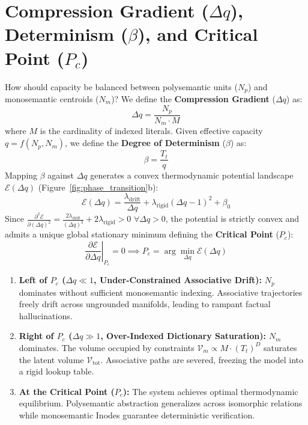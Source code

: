 \documentclass[10pt,twocolumn]{article}
\theoremstyle{definition}
\begin{document}
\section{Compression Gradient \texorpdfstring{($\Delta q$)}{(Delta q)}, Determinism \texorpdfstring{($\beta$)}{(beta)}, and Critical Point \texorpdfstring{($P_c$)}{(Pc)}}
How should capacity be balanced between polysemantic units ($N_p$) and monosemantic centroids ($N_m$)? We define the \textbf{Compression Gradient} ($\Delta q$) as:
\begin{equation}
    \Delta q = \frac{N_p}{N_m \cdot M}
\end{equation}
where $M$ is the cardinality of indexed literals. Given effective capacity $q = f(N_p, N_m)$, we define the \textbf{Degree of Determinism} ($\beta$) as:
\begin{equation}
    \beta = \frac{T_t}{q}
\end{equation}
Mapping $\beta$ against $\Delta q$ generates a convex thermodynamic potential landscape $\mathcal{E}(\Delta q)$ (Figure~\ref{fig:phase_transition}b):
\begin{equation}
    \mathcal{E}(\Delta q) = \frac{\lambda_{\mathrm{drift}}}{\Delta q} + \lambda_{\mathrm{rigid}} (\Delta q - 1)^2 + \beta_0
\end{equation}
Since $\frac{\partial^2 \mathcal{E}}{\partial (\Delta q)^2} = \frac{2 \lambda_{\mathrm{drift}}}{(\Delta q)^3} + 2 \lambda_{\mathrm{rigid}} > 0$ $\forall \Delta q > 0$, the potential is strictly convex and admits a unique global stationary minimum defining the \textbf{Critical Point} ($P_c$):
\begin{equation}
    \left. \frac{\partial \mathcal{E}}{\partial \Delta q} \right|_{P_c} = 0 \implies P_c = \arg\min_{\Delta q} \mathcal{E}(\Delta q)
\end{equation}
\begin{enumerate}[leftmargin=*, itemsep=1.5pt, topsep=1.5pt]
    \item \textbf{Left of $P_c$ ($\Delta q \ll 1$, Under-Constrained Associative Drift):} $N_p$ dominates without sufficient monosemantic indexing. Associative trajectories freely drift across ungrounded manifolds, leading to rampant factual hallucinations.
    \item \textbf{Right of $P_c$ ($\Delta q \gg 1$, Over-Indexed Dictionary Saturation):} $N_m$ dominates. The volume occupied by constraints $\mathcal{V}_m \propto M \cdot (T_t)^D$ saturates the latent volume $\mathcal{V}_{\mathrm{tot}}$. Associative paths are severed, freezing the model into a rigid lookup table.
    \item \textbf{At the Critical Point ($P_c$):} The system achieves optimal thermodynamic equilibrium. Polysemantic abstraction generalizes across isomorphic relations while monosemantic Inodes guarantee deterministic verification.
\end{enumerate}
\end{document}

